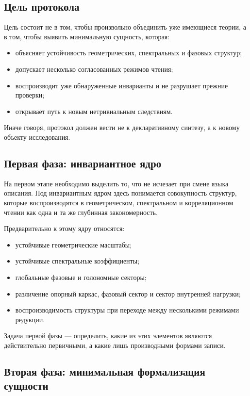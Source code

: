 \documentclass[12pt,a4paper]{article}
\begin{document}
\subsection{Цель протокола}

Цель состоит не в том, чтобы произвольно объединить уже имеющиеся теории, а в том, чтобы выявить минимальную сущность, которая:
\begin{itemize}
    \item объясняет устойчивость геометрических, спектральных и фазовых структур;
    \item допускает несколько согласованных режимов чтения;
    \item воспроизводит уже обнаруженные инварианты и не разрушает прежние проверки;
    \item открывает путь к новым нетривиальным следствиям.
\end{itemize}

Иначе говоря, протокол должен вести не к декларативному синтезу, а к новому объекту исследования.

\subsection{Первая фаза: инвариантное ядро}

На первом этапе необходимо выделить то, что не исчезает при смене языка описания. Под инвариантным ядром здесь понимается совокупность структур, которые воспроизводятся в геометрическом, спектральном и корреляционном чтении как одна и та же глубинная закономерность.

Предварительно к этому ядру относятся:
\begin{itemize}
    \item устойчивые геометрические масштабы;
    \item устойчивые спектральные коэффициенты;
    \item глобальные фазовые и голономные секторы;
    \item различение опорный каркас, фазовый сектор и сектор внутренней нагрузки;
    \item воспроизводимость структуры при переходе между несколькими режимами редукции.
\end{itemize}

Задача первой фазы --- определить, какие из этих элементов являются действительно первичными, а какие лишь производными формами записи.

\subsection{Вторая фаза: минимальная формализация сущности}
\end{document}
